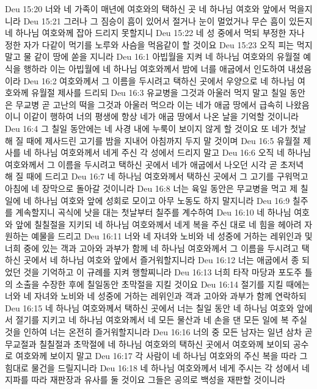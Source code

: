 Deu 15:20  너와 네 가족이 매년에 여호와의 택하신 곳 네 하나님 여호와 앞에서 먹을지니라
Deu 15:21  그러나 그 짐승이 흠이 있어서 절거나 눈이 멀었거나 무슨 흠이 있든지 네 하나님 여호와께 잡아 드리지 못할지니
Deu 15:22  네 성 중에서 먹되 부정한 자나 정한 자가 다같이 먹기를 노루와 사슴을 먹음같이 할 것이요
Deu 15:23  오직 피는 먹지 말고 물 같이 땅에 쏟을 지니라
Deu 16:1  아빕월을 지켜 네 하나님 여호와의 유월절 예식을 행하라 이는 아빕월에 네 하나님 여호와께서 밤에 너를 애굽에서 인도하여 내셨음이라
Deu 16:2  여호와께서 그 이름을 두시려고 택하신 곳에서 우양으로 네 하나님 여호와께 유월절 제사를 드리되
Deu 16:3  유교병을 그것과 아울러 먹지 말고 칠일 동안은 무교병 곧 고난의 떡을 그것과 아울러 먹으라 이는 네가 애굽 땅에서 급속히 나왔음이니 이같이 행하여 너의 평생에 항상 네가 애굽 땅에서 나온 날을 기억할 것이니라
Deu 16:4  그 칠일 동안에는 네 사경 내에 누룩이 보이지 않게 할 것이요 또 네가 첫날 해 질 때에 제사드린 고기를 밤을 지내어 아침까지 두지 말 것이며
Deu 16:5  유월절 제사를 네 하나님 여호와께서 네게 주신 각 성에서 드리지 말고
Deu 16:6  오직 네 하나님 여호와께서 그 이름을 두시려고 택하신 곳에서 네가 애굽에서 나오던 시각 곧 초저녁 해 질 때에 드리고
Deu 16:7  네 하나님 여호와께서 택하신 곳에서 그 고기를 구워먹고 아침에 네 장막으로 돌아갈 것이니라
Deu 16:8  너는 육일 동안은 무교병을 먹고 제 칠일에 네 하나님 여호와 앞에 성회로 모이고 아무 노동도 하지 말지니라
Deu 16:9  칠주를 계속할지니 곡식에 낫을 대는 첫날부터 칠주를 계수하여
Deu 16:10  네 하나님 여호와 앞에 칠칠절을 지키되 네 하나님 여호와께서 네게 복을 주신 대로 네 힘을 헤아려 자원하는 예물을 드리고
Deu 16:11  너와 네 자녀와 노비와 네 성중에 거하는 레위인과 및 너희 중에 있는 객과 고아와 과부가 함께 네 하나님 여호와께서 그 이름을 두시려고 택하신 곳에서 네 하나님 여호와 앞에서 즐거워할지니라
Deu 16:12  너는 애굽에서 종 되었던 것을 기억하고 이 규례를 지켜 행할찌니라
Deu 16:13  너희 타작 마당과 포도주 틀의 소출을 수장한 후에 칠일동안 초막절을 지킬 것이요
Deu 16:14  절기를 지킬 때에는 너와 네 자녀와 노비와 네 성중에 거하는 레위인과 객과 고아와 과부가 함께 연락하되
Deu 16:15  네 하나님 여호와께서 택하신 곳에서 너는 칠일 동안 네 하나님 여호와 앞에서 절기를 지키고 네 하나님 여호와께서 네 모든 물산과 네 손을 댄 모든 일에 복 주실 것을 인하여 너는 온전히 즐거워할지니라
Deu 16:16  너의 중 모든 남자는 일년 삼차 곧 무교절과 칠칠절과 초막절에 네 하나님 여호와의 택하신 곳에서 여호와께 보이되 공수로 여호와께 보이지 말고
Deu 16:17  각 사람이 네 하나님 여호와의 주신 복을 따라 그 힘대로 물건을 드릴지니라
Deu 16:18  네 하나님 여호와께서 네게 주시는 각 성에서 네 지파를 따라 재판장과 유사를 둘 것이요 그들은 공의로 백성을 재판할 것이니라
